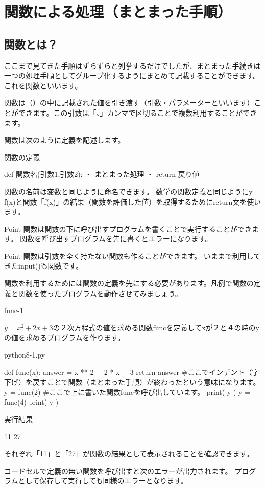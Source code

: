 \documentclass[11pt,a4paper,dvipdfmx,titlepage]{jsreport}
\begin{document}
\newpage
\section{関数による処理（まとまった手順）}
\subsection{関数とは？}
ここまで見てきた手順はずらずらと列挙するだけでしたが、まとまった手続きは一つの処理手順としてグループ化するようにまとめて記載することができます。
これを関数といいます。

関数は（）の中に記載された値を引き渡す（引数・パラメーターといいます）ことができます。この引数は「、」カンマで区切ることで複数利用することができます。

関数は次のように定義を記述します。
\begin{grabox}{関数の定義}
\begin{listing}{1}
def 関数名(引数1,引数2):
    ・
    まとまった処理
    ・
    return 戻り値
\end{listing}
\end{grabox}

関数の名前は変数と同じように命名できます。
数学の関数定義と同じようにy = f(x)と関数「f(x)」の結果（関数を評価した値）を取得するためにreturn文を使います。
\begin{hipoint}{Point}
関数は関数の下に呼び出すプログラムを書くことで実行することができます。
関数を呼び出すプログラムを先に書くとエラーになります。
\end{hipoint}


\begin{hipoint}{Point}
関数は引数を全く持たない関数も作ることができます。
いままで利用してきたinput()も関数です。
\end{hipoint}
関数を利用するためには関数の定義を先にする必要があります。凡例で関数の定義と関数を使ったプログラムを動作させてみましょう。
\newpage
\begin{pabox}{func-1}

$y = x^2 + 2 x + 3$の２次方程式の値を求める関数funcを定義してxが２と４の時のyの値を求めるプログラムを作ります。


\begin{codebox}{python8-1.py}
\begin{listing}{1}
def func(x):
    answer = x ** 2 + 2 * x + 3
    return answer
#ここでインデント（字下げ）を戻すことで関数（まとまった手順）が終わったという意味になります。
y = func(2) #ここで上に書いた関数funcを呼び出しています。
print( y )
y = func(4)
print( y )
\end{listing}
実行結果
\begin{listing}{1}
11
27
\end{listing}
\end{codebox}

それぞれ「11」と「27」が関数の結果として表示されることを確認できます。
\end{pabox}
 {\gt コードセル}で定義の無い関数を呼び出すと次のエラーが出力されます。
プログラムとして保存して実行しても同様のエラーとなります。
\end{document}

